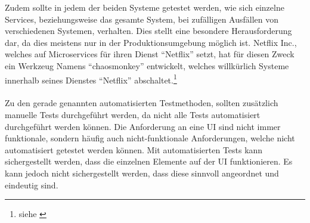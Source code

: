 Zudem sollte in jedem der beiden Systeme getestet werden, wie sich einzelne Services, beziehungsweise das gesamte System, bei zufälligen Ausfällen von verschiedenen Systemen, verhalten. Dies stellt eine besondere Herausforderung dar, da dies meistens nur in der Produktionsumgebung möglich ist. Netflix Inc., welches auf Microservices für ihren Dienst "`Netflix"' setzt, hat für diesen Zweck ein Werkzeug Namens "`chaosmonkey"' entwickelt, welches willkürlich Systeme innerhalb seines Dienstes "`Netflix"' abschaltet.\footnote{siehe \cite{chaosmonkey}}
\\\\
Zu den gerade genannten automatisierten Testmethoden, sollten zusätzlich manuelle Tests durchgeführt werden, da nicht alle Tests automatisiert durchgeführt werden können. Die Anforderung an eine UI sind nicht immer funktionale, sondern häufig auch nicht-funktionale Anforderungen, welche nicht automatisiert getestet werden können. Mit automatisierten Tests kann sichergestellt werden, dass die einzelnen Elemente auf der UI funktionieren. Es kann jedoch nicht sichergestellt werden, dass diese sinnvoll angeordnet und eindeutig sind.
